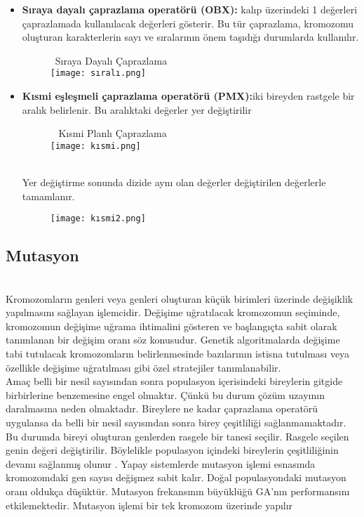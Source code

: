 \documentclass[12pt, a4paper]{article}
\begin{document}
\begin{flushleft}
\begin{itemize}
\begin{figure}[h]
		\end{figure}
		\item \textbf{Sıraya dayalı çaprazlama operatörü (OBX):}
		kalıp üzerindeki 1 değerleri çaprazlamada kullanılacak değerleri gösterir. Bu tür çaprazlama, 
		kromozomu oluşturan karakterlerin sayı ve sıralarının önem taşıdığı durumlarda 
		kullanılır.
		\begin{figure}[h]
			\ {Sıraya Dayalı Çaprazlama} \\[5pt]
			\centering
			\texttt{[image: sıralı.png]}
			\\[20pt]
		\end{figure}
		
		\item \textbf{Kısmi eşleşmeli çaprazlama operatörü (PMX):}iki bireyden rastgele bir 
		aralık belirlenir. Bu aralıktaki değerler yer değiştirilir
		\begin{figure}[h]
			\ { Kısmi Planlı Çaprazlama} \\[5pt]
			\centering
			\texttt{[image: kısmi.png]}
			\\[10pt]
		\end{figure}\\
		Yer değiştirme sonunda dizide aynı olan değerler değiştirilen değerlerle tamamlanır. 
		\begin{figure}[h]
			
			\centering
			\texttt{[image: kısmi2.png]}
			\\[10pt]
		\end{figure}
	\end{itemize}
	\newpage
	\subsection{ Mutasyon}\cite{kuccuk2021hemcsire}\\
	Kromozomların genleri veya genleri oluşturan küçük birimleri üzerinde 
	değişiklik yapılmasını sağlayan işlemcidir. Değişime uğratılacak kromozomun 
	seçiminde, kromozomun değişime uğrama ihtimalini gösteren ve başlangıçta sabit 
	olarak tanımlanan bir değişim oranı söz konusudur. Genetik algoritmalarda değişime
	tabi tutulacak kromozomların belirlenmesinde bazılarının istisna tutulması veya 
	özellikle değişime uğratılması gibi özel stratejiler tanımlanabilir.\\[5pt]
	
	Amaç belli bir nesil sayısından sonra populasyon içerisindeki bireylerin 
	gitgide birbirlerine benzemesine engel olmaktır. Çünkü bu durum çözüm uzayının 
	daralmasına neden olmaktadır. Bireylere ne kadar çaprazlama operatörü uygulansa 
	da belli bir nesil sayısından sonra birey çeşitliliği sağlanmamaktadır. Bu durumda 
	bireyi oluşturan genlerden rasgele bir tanesi seçilir. Rasgele seçilen genin değeri 
	değiştirilir. Böylelikle populasyon içindeki bireylerin çeşitliliğinin devamı sağlanmış
	olunur . Yapay sistemlerde mutasyon işlemi esnasında kromozomdaki 
	gen sayısı değişmez sabit kalır. Doğal populasyondaki mutasyon oranı oldukça 
	düşüktür. Mutasyon frekansının büyüklüğü GA’nın performansını etkilemektedir. 
	Mutasyon işlemi bir tek kromozom üzerinde yapılır\\[5pt]
	

\end{flushleft}
\end{document}
